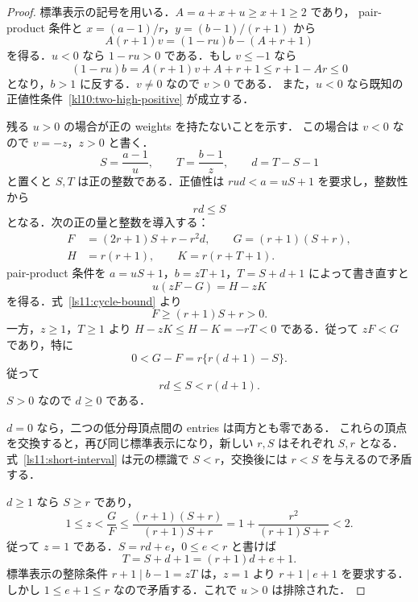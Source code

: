 \begin{proof}
標準表示の記号を用いる．$A=a+x+u\geq x+1\geq2$ であり，
pair-product 条件と $x=(a-1)/r$，$y=(b-1)/(r+1)$ から
\begin{equation}\label{ls11:linear-v}
 A(r+1)v=(1-ru)b-(A+r+1)
\end{equation}
を得る．$u<0$ なら $1-ru>0$ である．もし $v\leq-1$ なら
\[
 (1-ru)b=A(r+1)v+A+r+1
 \leq r+1-Ar\leq0
\]
となり，$b>1$ に反する．$v\ne0$ なので $v>0$ である．
また，$u<0$ なら既知の正値性条件~\eqref{kl10:two-high-positive} が成立する．

残る $u>0$ の場合が正の weights を持たないことを示す．
この場合は $v<0$ なので $v=-z$，$z>0$ と書く．
\[
 S=\frac{a-1}{u},\qquad T=\frac{b-1}{z},\qquad
 d=T-S-1
\]
と置くと $S,T$ は正の整数である．正値性は
$rud<a=uS+1$ を要求し，整数性から
\begin{equation}\label{ls11:cycle-bound}
 rd\leq S
\end{equation}
となる．次の正の量と整数を導入する：
\[
 \begin{split}
 F&=(2r+1)S+r-r^2d,\qquad G=(r+1)(S+r),\\
 H&=r(r+1),\qquad K=r(r+T+1).
 \end{split}
\]
pair-product 条件を $a=uS+1$，$b=zT+1$，$T=S+d+1$ によって書き直すと
\begin{equation}\label{ls11:bilinear-positive}
 u(zF-G)=H-zK
\end{equation}
を得る．式~\eqref{ls11:cycle-bound} より
\[
 F\geq(r+1)S+r>0.
\]
一方，$z\geq1$，$T\geq1$ より
$H-zK\leq H-K=-rT<0$ である．従って $zF<G$ であり，特に
\[
 0<G-F=r\{r(d+1)-S\}.
\]
従って
\begin{equation}\label{ls11:short-interval}
 rd\leq S<r(d+1).
\end{equation}
$S>0$ なので $d\geq0$ である．

$d=0$ なら，二つの低分母頂点間の entries は両方とも零である．
これらの頂点を交換すると，再び同じ標準表示になり，新しい $r,S$ はそれぞれ $S,r$ となる．
式~\eqref{ls11:short-interval} は元の標識で $S<r$，交換後には $r<S$ を与えるので矛盾する．

$d\geq1$ なら $S\geq r$ であり，
\[
 1\leq z<\frac GF
 \leq\frac{(r+1)(S+r)}{(r+1)S+r}
 =1+\frac{r^2}{(r+1)S+r}<2.
\]
従って $z=1$ である．$S=rd+e$，$0\leq e<r$ と書けば
\[
 T=S+d+1=(r+1)d+e+1.
\]
標準表示の整除条件 $r+1\mid b-1=zT$ は，$z=1$ より $r+1\mid e+1$ を要求する．
しかし $1\leq e+1\leq r$ なので矛盾する．これで $u>0$ は排除された．
\end{proof}

